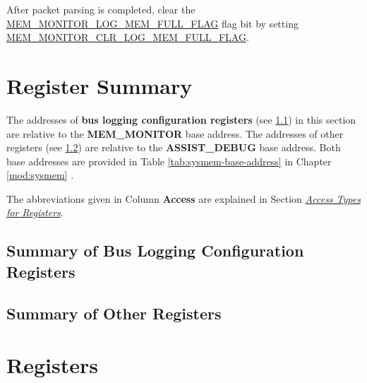 \documentclass[main\_\_EN.tex]{subfiles}
\begin{document}
After packet parsing is completed, clear the \hyperref[fielddesc:MEMMONITORLOGMEMFULLFLAG]{MEM\_MONITOR\_LOG\_MEM\_FULL\_FLAG} flag bit by setting \hyperref[fielddesc:MEMMONITORCLRLOGMEMFULLFLAG]{MEM\_MONITOR\_CLR\_LOG\_MEM\_FULL\_FLAG}.


\clearpage
\hypertarget{dbgassist-reg-summ}{}
\section{Register Summary}
\label{sec:dbgassist-reg-summ}

The addresses of \textbf{bus logging configuration registers} (see \ref{sec:dbgassist-mem-monitor-reg-summ}) in this section are relative to the \textbf{MEM\_MONITOR} base address. The addresses of other registers (see \ref{sec:dbgassist-bus-monitor-reg-summ}) are relative to the \textbf{ASSIST\_DEBUG} base address. Both base addresses are provided in Table \ref{tab:sysmem-base-address} in Chapter \ref{mod:sysmem} \textit{}.

The abbreviations given in Column \textbf{Access} are explained in Section \hyperref[glossary-access-types]{\textit{Access Types for Registers}}.

\subsection{Summary of Bus Logging Configuration Registers}
\label{sec:dbgassist-mem-monitor-reg-summ}



\subsection{Summary of Other Registers}
\label{sec:dbgassist-bus-monitor-reg-summ}





\clearpage
\section{Registers}
\end{document}
